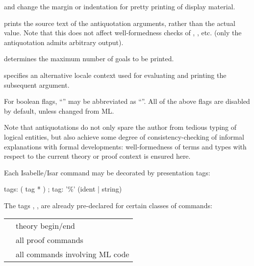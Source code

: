 \begin{isabellebody}
\begin{isamarkuptext}
\begin{descr}
  \item[\isa{margin\ {\isacharequal}\ nat} and \isa{indent\ {\isacharequal}\ nat}] change the
  margin or indentation for pretty printing of display material.

  \item[\isa{source\ {\isacharequal}\ bool}] prints the source text of the
  antiquotation arguments, rather than the actual value.  Note that
  this does not affect well-formedness checks of , , etc. (only the  antiquotation admits arbitrary output).

  \item[\isa{goals{\isacharunderscore}limit\ {\isacharequal}\ nat}] determines the maximum number of
  goals to be printed.

  \item[\isa{locale\ {\isacharequal}\ name}] specifies an alternative locale
  context used for evaluating and printing the subsequent argument.

  \end{descr}

  For boolean flags, ``'' may be abbreviated as
  ``''.  All of the above flags are disabled by default,
  unless changed from ML.

  \medskip Note that antiquotations do not only spare the author from
  tedious typing of logical entities, but also achieve some degree of
  consistency-checking of informal explanations with formal
  developments: well-formedness of terms and types with respect to the
  current theory or proof context is ensured here.%
\end{isamarkuptext}%
\isamarkuptrue%
%
\isamarkuptrue%
%
\begin{isamarkuptext}%
Each Isabelle/Isar command may be decorated by presentation tags:

  \begin{rail}
    tags: ( tag * )
    ;
    tag: '\%' (ident | string)
  \end{rail}

  The tags , ,  are already
  pre-declared for certain classes of commands:

 \medskip

  \begin{tabular}{ll}
    \isa{theory} & theory begin/end \\
    \isa{proof} & all proof commands \\
    \isa{ML} & all commands involving ML code \\
  \end{tabular}


\end{isamarkuptext}
\end{isabellebody}
